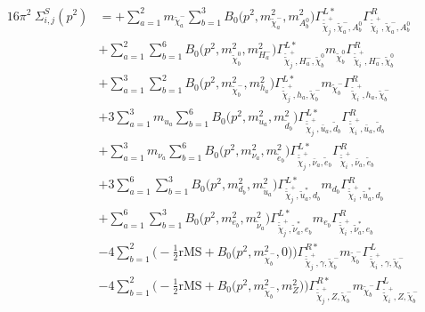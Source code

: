 \begin{itemize}
\begin{align} 
16\pi^2 \ \Sigma^S_{i,j}(p^2) &= +\sum_{a=1}^{2}m_{\tilde{\chi}^-_{{a}}} \sum_{b=1}^{3}{B_0\Big(p^{2},m^2_{\tilde{\chi}^-_{{a}}},m^2_{A^0_{{b}}}\Big)} {\Gamma^{L*}_{\check{\tilde{\chi}}^+_{{j}},\tilde{\chi}^-_{{a}},A^0_{{b}}}} {\Gamma^R_{\check{\tilde{\chi}}^+_{{i}},\tilde{\chi}^-_{{a}},A^0_{{b}}}}  \nonumber \\ 
 &+\sum_{a=1}^{2}\sum_{b=1}^{6}{B_0\Big(p^{2},m^2_{\tilde{\chi}^0_{{b}}},m^2_{H^-_{{a}}}\Big)} {\Gamma^{L*}_{\check{\tilde{\chi}}^+_{{j}},H^-_{{a}},\tilde{\chi}^0_{{b}}}} m_{\tilde{\chi}^0_{{b}}} {\Gamma^R_{\check{\tilde{\chi}}^+_{{i}},H^-_{{a}},\tilde{\chi}^0_{{b}}}} \nonumber \\ 
 &+\sum_{a=1}^{3}\sum_{b=1}^{2}{B_0\Big(p^{2},m^2_{\tilde{\chi}^-_{{b}}},m^2_{h_{{a}}}\Big)} {\Gamma^{L*}_{\check{\tilde{\chi}}^+_{{j}},h_{{a}},\tilde{\chi}^-_{{b}}}} m_{\tilde{\chi}^-_{{b}}} {\Gamma^R_{\check{\tilde{\chi}}^+_{{i}},h_{{a}},\tilde{\chi}^-_{{b}}}} \nonumber \\ 
 &+3 \sum_{a=1}^{3}m_{u_{{a}}} \sum_{b=1}^{6}{B_0\Big(p^{2},m^2_{u_{{a}}},m^2_{\tilde{d}_{{b}}}\Big)} {\Gamma^{L*}_{\check{\tilde{\chi}}^+_{{j}},\bar{u}_{{a}},\tilde{d}_{{b}}}} {\Gamma^R_{\check{\tilde{\chi}}^+_{{i}},\bar{u}_{{a}},\tilde{d}_{{b}}}}   \nonumber \\ 
 &+\sum_{a=1}^{3}m_{\nu_{{a}}} \sum_{b=1}^{6}{B_0\Big(p^{2},m^2_{\nu_{{a}}},m^2_{\tilde{e}_{{b}}}\Big)} {\Gamma^{L*}_{\check{\tilde{\chi}}^+_{{j}},\bar{\nu}_{{a}},\tilde{e}_{{b}}}} {\Gamma^R_{\check{\tilde{\chi}}^+_{{i}},\bar{\nu}_{{a}},\tilde{e}_{{b}}}}  \nonumber \\ 
 &+3 \sum_{a=1}^{6}\sum_{b=1}^{3}{B_0\Big(p^{2},m^2_{d_{{b}}},m^2_{\tilde{u}_{{a}}}\Big)} {\Gamma^{L*}_{\check{\tilde{\chi}}^+_{{j}},\tilde{u}^*_{{a}},d_{{b}}}} m_{d_{{b}}} {\Gamma^R_{\check{\tilde{\chi}}^+_{{i}},\tilde{u}^*_{{a}},d_{{b}}}}  \nonumber \\ 
 &+\sum_{a=1}^{6}\sum_{b=1}^{3}{B_0\Big(p^{2},m^2_{e_{{b}}},m^2_{\tilde{\nu}_{{a}}}\Big)} {\Gamma^{L*}_{\check{\tilde{\chi}}^+_{{j}},\tilde{\nu}^*_{{a}},e_{{b}}}} m_{e_{{b}}} {\Gamma^R_{\check{\tilde{\chi}}^+_{{i}},\tilde{\nu}^*_{{a}},e_{{b}}}} \nonumber \\ 
 &-4 \sum_{b=1}^{2}\Big(-\frac{1}{2} \text{rMS}  + {B_0\Big(p^{2},m^2_{\tilde{\chi}^-_{{b}}},0\Big)}\Big){\Gamma^{R*}_{\check{\tilde{\chi}}^+_{{j}},\gamma,\tilde{\chi}^-_{{b}}}} m_{\tilde{\chi}^-_{{b}}} {\Gamma^L_{\check{\tilde{\chi}}^+_{{i}},\gamma,\tilde{\chi}^-_{{b}}}}  \nonumber \\ 
 &-4 \sum_{b=1}^{2}\Big(-\frac{1}{2} \text{rMS}  + {B_0\Big(p^{2},m^2_{\tilde{\chi}^-_{{b}}},m^2_{Z}\Big)}\Big){\Gamma^{R*}_{\check{\tilde{\chi}}^+_{{j}},Z,\tilde{\chi}^-_{{b}}}} m_{\tilde{\chi}^-_{{b}}} {\Gamma^L_{\check{\tilde{\chi}}^+_{{i}},Z,\tilde{\chi}^-_{{b}}}}  \nonumber \\ 

\end{align}
\end{itemize}
